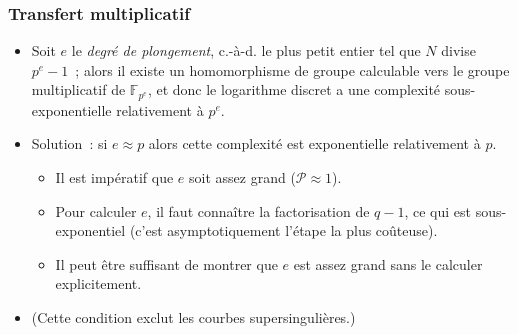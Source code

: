 \documentclass[francais]{beamer}
\newcommand{\F}{\mathbb{F}}
\newcommand{\prob}{\mathcal{P}}
\begin{document}
\begin{frame}\frametitle{Transfert multiplicatif}
\begin{itemize}
\item Soit $e$ le \emph{degré de plongement},
c.-à-d. le plus petit entier tel que $N$ divise $p^e - 1$ ;
alors il existe un homomorphisme de groupe calculable vers
le groupe multiplicatif de $\F_{p^e}$,
et donc le logarithme discret a une complexité
sous-exponentielle relativement à $p^e$.
\item Solution : si $e ≈ p$ alors cette
complexité est exponentielle relativement à $p$.
\begin{block}{}
\begin{itemize}
\item Il est impératif que $e$ soit assez grand ($\prob ≈ 1$).
\item
Pour calculer $e$, il faut connaître la factorisation de $q-1$,
ce qui est sous-exponentiel
(c'est asymptotiquement l'étape la plus coûteuse).
\item Il peut être suffisant de montrer que $e$ est assez grand
sans le calculer explicitement.
\end{itemize}
\end{block}
\item (Cette condition exclut les courbes supersingulières.)
\end{itemize}
\end{frame}
\end{document}
